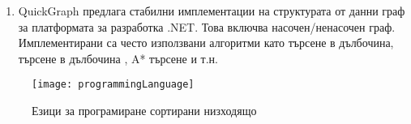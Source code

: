 \begin{enumerate}
    \item QuickGraph предлага стабилни имплементации на структурата от данни граф за платформата за разработка .NET. Това включва насочен/ненасочен граф. Имплементирани са често използвани алгоритми като търсене в дълбочина, търсене в дълбочина , A* търсене и т.н. \cite{quickgraph}

    
\end{enumerate}


\begin{figure}
    \centering
    \texttt{[image: programmingLanguage]}
    \caption{Езици за програмиране сортирани низходящо}
    \label{fig:prog}
\end{figure}
